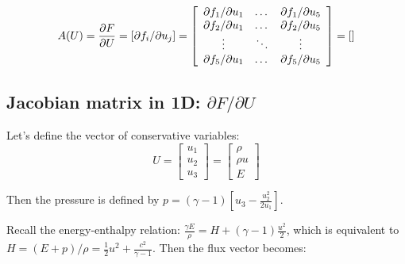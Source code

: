 \documentclass{article}
\begin{document}
\begin{equation}
  A(U)=\frac{\partial F}{\partial U} = \left[ \partial f_i/\partial u_j \right] = \left [
    \begin{array}{c c c}
      \partial f_1/\partial u_1 & \dots & \partial f_1/\partial u_5\\
      \partial f_2/\partial u_1 & \dots & \partial f_2/\partial u_5\\
      \vdots & \ddots & \vdots\\
      \partial f_5/\partial u_1 & \dots & \partial f_5/\partial u_5\\
    \end{array} \right ]
  = \left[
    \begin{array}{c c c c c}

    \end{array} \right ]
\end{equation}

\subsection{Jacobian matrix in 1D: \boldmath $\partial F/\partial U$}

Let's define the vector of conservative variables:
\begin{equation}
  U = \left[
    \begin{array}{c}
      u_1\\
      u_2\\
      u_3
    \end{array}
  \right] = \left[
    \begin{array}{c}
      \rho\\
      \rho u\\
      E
    \end{array}
  \right]
\end{equation}

Then the pressure is defined by $p=(\gamma-1)[u_3-\frac{u_2^2}{2u_1} ]$.

Recall the energy-enthalpy relation: $\frac{\gamma E}{\rho} = H+(\gamma-1)\frac{u^2}{2}$, which is equivalent to $H=(E+p)/\rho = \frac{1}{2}u^2+\frac{c^2}{\gamma-1}$. Then the flux vector becomes:
\end{document}
